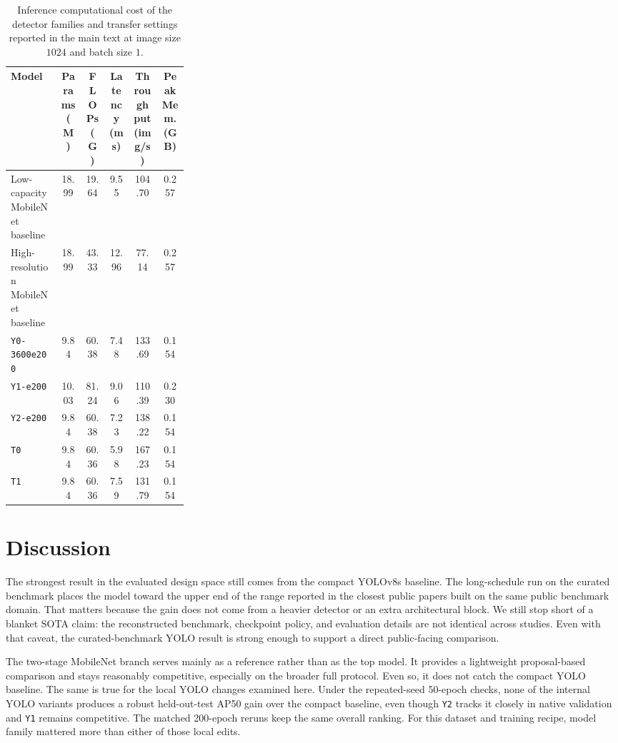 \documentclass[10pt,a4paper]{article}
\begin{document}
\begin{table}[t]
  \centering
  \caption{Inference computational cost of the detector families and transfer settings reported in the main text at image size $1024$ and batch size $1$.}
  \label{tab:efficiency}
  \footnotesize
  \setlength{\tabcolsep}{4pt}
  \begin{tabularx}{\linewidth}{>{\raggedright\arraybackslash}p{0.29\linewidth} c c c c c}
    \toprule
    Model & Params (M) & FLOPs (G) & Latency (ms) & Throughput (img/s) & Peak Mem. (GB) \\
    \midrule
    Low-capacity MobileNet baseline & 18.99 & 19.64 & 9.55 & 104.70 & 0.257 \\
    High-resolution MobileNet baseline & 18.99 & 43.33 & 12.96 & 77.14 & 0.257 \\
    \texttt{Y0-3600e200} & 9.84 & 60.38 & 7.48 & 133.69 & 0.154 \\
    \texttt{Y1-e200} & 10.03 & 81.24 & 9.06 & 110.39 & 0.230 \\
    \texttt{Y2-e200} & 9.84 & 60.38 & 7.23 & 138.22 & 0.154 \\
    \texttt{T0} & 9.84 & 60.36 & 5.98 & 167.23 & 0.154 \\
    \texttt{T1} & 9.84 & 60.36 & 7.59 & 131.79 & 0.154 \\
    \bottomrule
  \end{tabularx}
\end{table}

\section{Discussion}
\label{sec:discussion}

The strongest result in the evaluated design space still comes from the compact YOLOv8s baseline. The long-schedule run on the curated benchmark places the model toward the upper end of the range reported in the closest public papers built on the same public benchmark domain. That matters because the gain does not come from a heavier detector or an extra architectural block. We still stop short of a blanket SOTA claim: the reconstructed benchmark, checkpoint policy, and evaluation details are not identical across studies. Even with that caveat, the curated-benchmark YOLO result is strong enough to support a direct public-facing comparison.

The two-stage MobileNet branch serves mainly as a reference rather than as the top model. It provides a lightweight proposal-based comparison and stays reasonably competitive, especially on the broader full protocol. Even so, it does not catch the compact YOLO baseline. The same is true for the local YOLO changes examined here. Under the repeated-seed 50-epoch checks, none of the internal YOLO variants produces a robust held-out-test AP50 gain over the compact baseline, even though \texttt{Y2} tracks it closely in native validation and \texttt{Y1} remains competitive. The matched 200-epoch reruns keep the same overall ranking. For this dataset and training recipe, model family mattered more than either of those local edits.
\end{document}
